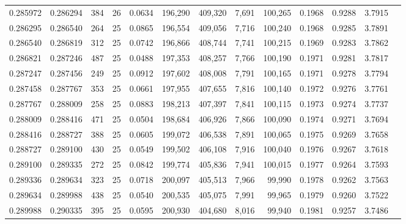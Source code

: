 \begin{tabular}{rrrrrrrrrrrrr}
0.285972 & 0.286294 &   384 &  26 &                                     0.0634 & 196,290 & 409,320 &   7,691 & 100,265 & 0.1968 & 0.9288 & 3.7915 \\
0.286295 & 0.286540 &   264 &  25 &                                     0.0865 & 196,554 & 409,056 &   7,716 & 100,240 & 0.1968 & 0.9285 & 3.7891 \\
0.286540 & 0.286819 &   312 &  25 &                                     0.0742 & 196,866 & 408,744 &   7,741 & 100,215 & 0.1969 & 0.9283 & 3.7862 \\
0.286821 & 0.287246 &   487 &  25 &                                     0.0488 & 197,353 & 408,257 &   7,766 & 100,190 & 0.1971 & 0.9281 & 3.7817 \\
0.287247 & 0.287456 &   249 &  25 &                                     0.0912 & 197,602 & 408,008 &   7,791 & 100,165 & 0.1971 & 0.9278 & 3.7794 \\
0.287458 & 0.287767 &   353 &  25 &                                     0.0661 & 197,955 & 407,655 &   7,816 & 100,140 & 0.1972 & 0.9276 & 3.7761 \\
0.287767 & 0.288009 &   258 &  25 &                                     0.0883 & 198,213 & 407,397 &   7,841 & 100,115 & 0.1973 & 0.9274 & 3.7737 \\
0.288009 & 0.288416 &   471 &  25 &                                     0.0504 & 198,684 & 406,926 &   7,866 & 100,090 & 0.1974 & 0.9271 & 3.7694 \\
0.288416 & 0.288727 &   388 &  25 &                                     0.0605 & 199,072 & 406,538 &   7,891 & 100,065 & 0.1975 & 0.9269 & 3.7658 \\
0.288727 & 0.289100 &   430 &  25 &                                     0.0549 & 199,502 & 406,108 &   7,916 & 100,040 & 0.1976 & 0.9267 & 3.7618 \\
0.289100 & 0.289335 &   272 &  25 &                                     0.0842 & 199,774 & 405,836 &   7,941 & 100,015 & 0.1977 & 0.9264 & 3.7593 \\
0.289336 & 0.289634 &   323 &  25 &                                     0.0718 & 200,097 & 405,513 &   7,966 &  99,990 & 0.1978 & 0.9262 & 3.7563 \\
0.289634 & 0.289988 &   438 &  25 &                                     0.0540 & 200,535 & 405,075 &   7,991 &  99,965 & 0.1979 & 0.9260 & 3.7522 \\
0.289988 & 0.290335 &   395 &  25 &                                     0.0595 & 200,930 & 404,680 &   8,016 &  99,940 & 0.1981 & 0.9257 & 3.7486 \\

\end{tabular}
